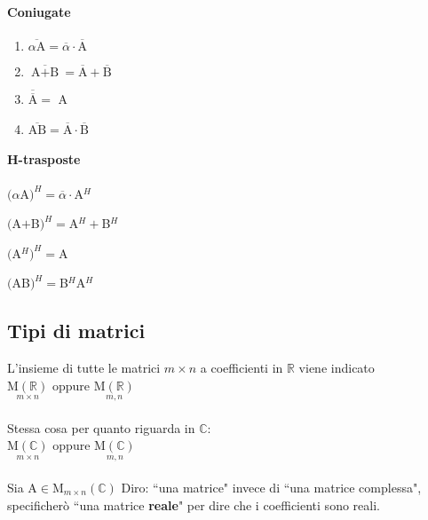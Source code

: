 \paragraph{Coniugate}
\begin{enumerate} 
    \item $\overline{\alpha\textrm{A}}=\overline{\alpha}\cdot\overline{\textrm{A}}$
    \item $\overline{\textrm{A}+\textrm{B}}=\overline{\textrm{A}}+\overline{\textrm{B}}$
    \item $\overline{\overline{\textrm{A}}}=$ A
    \item $\overline{\textrm{AB}}=\overline{\textrm{A}}\cdot\overline{\textrm{B}}$ 
\end{enumerate} 

\paragraph{H-trasposte}
\begin{enumerate}
        {\color{red}
    \item $(\alpha $A$)^H=\overline{\alpha}\cdot $A$^H$
        }
    \item $($A$+$B$)^H=$A$^H+$B$^H$
    \item $($A$^H)^H=$A
        {\color{red}
    \item $($AB$)^H=$B$^H$A$^H$
        }
\end{enumerate}
\subsection{Tipi di matrici}
L'insieme di tutte le matrici $m\times n$ a coefficienti in $\mathbb{R}$ viene indicato\\

$\underset{m\times n}{\textrm{M}(\mathbb{R})}$
oppure
$\underset{m,n}{\textrm{M}(\mathbb{R})}$\\\\
Stessa cosa per quanto riguarda in $\mathbb{C}$:\\

$\underset{m\times n}{\textrm{M}(\mathbb{C})}$
oppure
$\underset{m,n}{\textrm{M}(\mathbb{C})}$\\
\\
Sia A$\in$M$_{m\times n}(\mathbb{C})$
Diro: ``una matrice" invece di ``una matrice complessa", specificherò 
``una matrice \textbf{reale}" per dire che i coefficienti sono reali. 

